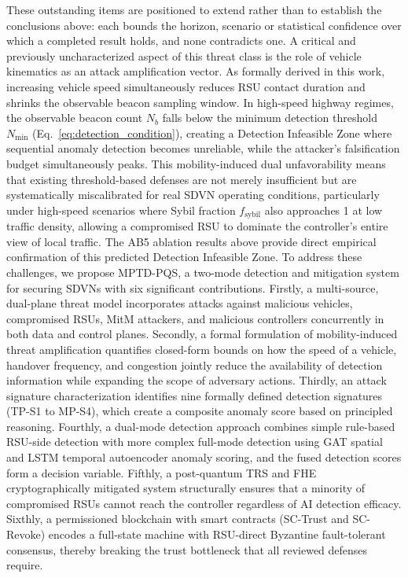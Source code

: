 \documentclass[12pt, a4paper]{report}
\begin{document}
These outstanding items are positioned to extend rather than to
establish the conclusions above: each bounds the horizon, scenario or
statistical confidence over which a completed result holds, and none
contradicts one.
\newline
\newline
A critical and previously uncharacterized aspect of this threat class is
the role of vehicle kinematics as an attack amplification vector. As
formally derived in this work, increasing vehicle speed simultaneously
reduces RSU contact duration and shrinks the observable beacon
sampling window. In high-speed highway regimes, the observable beacon
count $N_b$ falls below the minimum detection threshold $N_{\min}$
(Eq.~\ref{eq:detection_condition}), creating a Detection
Infeasible Zone where sequential anomaly detection becomes unreliable,
while the attacker's falsification budget simultaneously peaks. This
mobility-induced dual unfavorability means that existing threshold-based
defenses are not merely insufficient but are systematically miscalibrated
for real SDVN operating conditions, particularly under high-speed
scenarios where Sybil fraction $f_{\mathrm{sybil}}$ also approaches 1
at low traffic density, allowing a compromised RSU to dominate the
controller's entire view of local traffic. The AB5 ablation results
above provide direct empirical confirmation of this predicted Detection
Infeasible Zone.
\newline\newline
To address these challenges, we propose MPTD-PQS, a two-mode
detection and mitigation system for securing SDVNs with six significant
contributions. Firstly, a multi-source, dual-plane threat model incorporates
attacks against malicious vehicles, compromised RSUs, MitM attackers, and
malicious controllers concurrently in both data and control planes. Secondly,
a formal formulation of mobility-induced threat amplification quantifies
closed-form bounds on how the speed of a vehicle, handover frequency, and
congestion jointly reduce the availability of detection information while
expanding the scope of adversary actions. Thirdly, an attack signature
characterization identifies nine formally defined detection signatures
(TP-S1 to MP-S4), which create a composite anomaly score based on
principled reasoning. Fourthly, a dual-mode detection approach combines
simple rule-based RSU-side detection with more complex full-mode detection
using GAT spatial and LSTM temporal autoencoder anomaly scoring, and the
fused detection scores form a decision variable. Fifthly, a post-quantum
TRS and FHE cryptographically mitigated system structurally ensures that a
minority of compromised RSUs cannot reach the controller regardless of AI
detection efficacy. Sixthly, a permissioned blockchain with smart contracts
(SC-Trust and SC-Revoke) encodes a full-state machine with RSU-direct
Byzantine fault-tolerant consensus, thereby breaking the trust bottleneck
that all reviewed defenses require.

\renewcommand{\bibname}{References}


\end{document}
